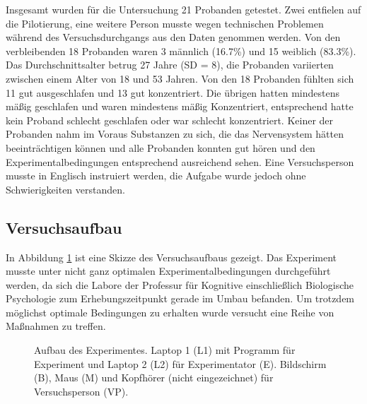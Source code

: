 \documentclass[doc,a4paper,12pt]{apa6}
\begin{document}
Insgesamt wurden für die Untersuchung 21 Probanden getestet. Zwei entfielen auf die Pilotierung, eine weitere Person musste wegen technischen Problemen während des Versuchsdurchgangs aus den Daten genommen werden. Von den verbleibenden 18 Probanden waren 3 männlich (16.7\%) und 15 weiblich (83.3\%). Das Durchschnittsalter betrug 27 Jahre (SD = 8), die Probanden variierten zwischen einem Alter von 18 und 53 Jahren. Von den 18 Probanden fühlten sich 11 gut ausgeschlafen und 13 gut konzentriert. Die übrigen hatten mindestens mäßig geschlafen und waren mindestens mäßig Konzentriert, entsprechend hatte kein Proband schlecht geschlafen oder war schlecht konzentriert. Keiner der Probanden nahm im Voraus Substanzen zu sich, die das Nervensystem hätten beeinträchtigen können und alle Probanden konnten gut hören und den Experimentalbedingungen entsprechend ausreichend sehen. Eine Versuchsperson musste in Englisch instruiert werden, die Aufgabe wurde jedoch ohne Schwierigkeiten verstanden.

\subsection{Versuchsaufbau}

In Abbildung \ref{experiment} ist eine Skizze des Versuchsaufbaus gezeigt. Das Experiment musste unter nicht ganz optimalen Experimentalbedingungen durchgeführt werden, da sich die Labore der Professur für Kognitive einschließlich Biologische Psychologie zum Erhebungszeitpunkt gerade im Umbau befanden. Um trotzdem möglichst optimale Bedingungen zu erhalten wurde versucht eine Reihe von Maßnahmen zu treffen.

\newpage

\begin{figure}
  \centering
  \begin{minipage}{.55\textwidth}
    \setlength{\fboxsep}{.05\textwidth}
    \vspace{10pt}
    \caption{Aufbau des Experimentes. Laptop 1 (L1) mit Programm für Experiment und Laptop 2 (L2) für Experimentator (E). Bildschirm (B), Maus (M) und Kopfhörer (nicht eingezeichnet) für Versuchsperson (VP).}
    \label{experiment}
  \end{minipage}
\end{figure}
\end{document}
